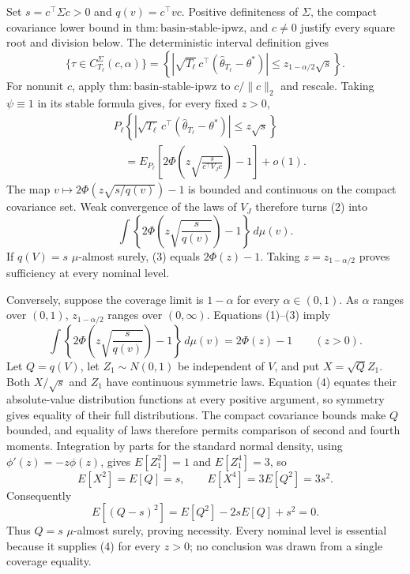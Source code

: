 Set \(s=c^\top\Sigma c>0\) and \(q(v)=c^\top vc\). Positive definiteness of \(\Sigma\), the compact covariance lower bound in \(\mathrm{thm:basin\text{-}stable\text{-}ipwz}\), and \(c\ne0\) justify every square root and division below. The deterministic interval definition gives
\[
 \{\tau\in C_{T_\ell}^{\Sigma}(c,\alpha)\}
 =\left\{\left|\sqrt{T_\ell}\,c^\top(\widehat\theta_{T_\ell}-\theta^*)\right|
 \le z_{1-\alpha/2}\sqrt s\right\}.
\tag{1}
\]
For nonunit \(c\), apply \(\mathrm{thm:basin\text{-}stable\text{-}ipwz}\) to \(c/\|c\|_2\) and rescale. Taking \(\psi\equiv1\) in its stable formula gives, for every fixed \(z>0\),
\[
\begin{aligned}
 &P_\ell\!\left\{\left|\sqrt{T_\ell}\,c^\top
 (\widehat\theta_{T_\ell}-\theta^*)\right|\le z\sqrt s\right\}\\
 &\quad=E_{P_\ell}\!\left[2\Phi\!\left(z\sqrt{\frac{s}{c^\top V_Jc}}\right)-1\right]+o(1).
\end{aligned}
\tag{2}
\]
The map \(v\mapsto2\Phi(z\sqrt{s/q(v)})-1\) is bounded and continuous on the compact covariance set. Weak convergence of the laws of \(V_J\) therefore turns (2) into
\[
 \int\left\{2\Phi\!\left(z\sqrt{\frac{s}{q(v)}}\right)-1\right\}\,d\mu(v).
\tag{3}
\]
If \(q(V)=s\) \(\mu\)-almost surely, (3) equals \(2\Phi(z)-1\). Taking \(z=z_{1-\alpha/2}\) proves sufficiency at every nominal level.

Conversely, suppose the coverage limit is \(1-\alpha\) for every \(\alpha\in(0,1)\). As \(\alpha\) ranges over \((0,1)\), \(z_{1-\alpha/2}\) ranges over \((0,\infty)\). Equations (1)--(3) imply
\[
 \int\left\{2\Phi\!\left(z\sqrt{\frac{s}{q(v)}}\right)-1\right\}\,d\mu(v)
 =2\Phi(z)-1\qquad(z>0).
\tag{4}
\]
Let \(Q=q(V)\), let \(Z_1\sim N(0,1)\) be independent of \(V\), and put \(X=\sqrt QZ_1\). Both \(X/\sqrt s\) and \(Z_1\) have continuous symmetric laws. Equation (4) equates their absolute-value distribution functions at every positive argument, so symmetry gives equality of their full distributions. The compact covariance bounds make \(Q\) bounded, and equality of laws therefore permits comparison of second and fourth moments. Integration by parts for the standard normal density, using \(\phi'(z)=-z\phi(z)\), gives \(E[Z_1^2]=1\) and \(E[Z_1^4]=3\), so
\[
 E[X^2]=E[Q]=s,
 \qquad E[X^4]=3E[Q^2]=3s^2.
\tag{5}
\]
Consequently
\[
 E[(Q-s)^2]=E[Q^2]-2sE[Q]+s^2=0.
\tag{6}
\]
Thus \(Q=s\) \(\mu\)-almost surely, proving necessity. Every nominal level is essential because it supplies (4) for every \(z>0\); no conclusion was drawn from a single coverage equality.